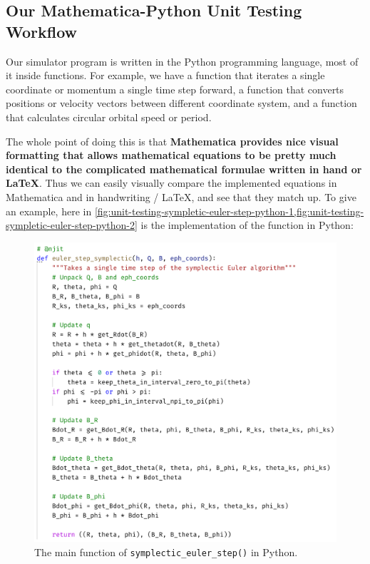 \subsection{Our Mathematica-Python Unit Testing Workflow}
Our simulator program is written in the Python programming language, most of it inside functions. For example, we have a function that iterates a single coordinate or momentum a single time step forward, a function that converts positions or velocity vectors between different coordinate system, and a function that calculates circular orbital speed or period.

The whole point of doing this is that \textbf{Mathematica provides nice visual formatting that allows mathematical equations to be pretty much identical to the complicated mathematical formulae written in hand or LaTeX}. Thus we can easily visually compare the implemented equations in Mathematica and in handwriting / LaTeX, and see that they match up. To give an example, here in \cref{fig:unit-testing-sympletic-euler-step-python-1,fig:unit-testing-sympletic-euler-step-python-2} is the implementation of the \texttt{} function in Python:

\begin{figure}[H]
    \centering
    \includegraphics[width=0.90\linewidth]{fig/unit-testing-sympletic-euler-step-python-1.png}
    \caption{The main function of \texttt{symplectic\_euler\_step()} in Python.}
    \label{fig:unit-testing-sympletic-euler-step-python-1}
\end{figure}

